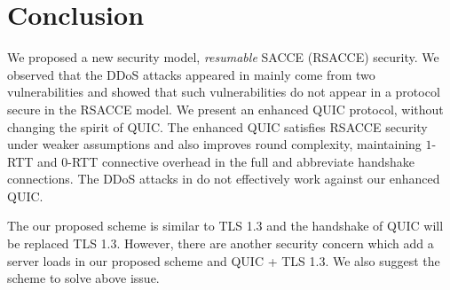 \section{Conclusion} \label{sec:conclusion}

We proposed a new security model, \textit{resumable} SACCE (RSACCE) security.
We observed that the DDoS attacks appeared in \cite{LJBN15:QUIC} mainly come from 
two vulnerabilities and showed that such vulnerabilities do not appear in a protocol secure in 
the RSACCE model. 
We present an enhanced QUIC protocol, without changing the spirit of QUIC.
The enhanced QUIC satisfies RSACCE security under weaker assumptions and also improves round complexity, 
maintaining $1$-RTT and $0$-RTT connective overhead in the full and abbreviate handshake connections.
The DDoS attacks in \cite{LJBN15:QUIC} do not effectively work against our enhanced QUIC.

The our proposed scheme is similar to TLS 1.3 and the handshake of QUIC will be replaced
TLS 1.3. However, there are another security concern which add a server loads in our
proposed scheme and QUIC + TLS 1.3.
We also suggest the scheme to solve above issue.
\fi